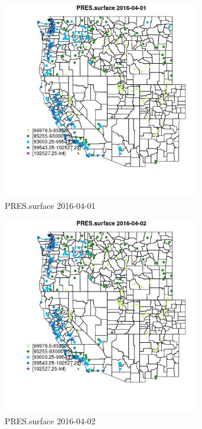 \begin{figure} 
\centering  
\includegraphics[width=0.77\textwidth]{Code_Outputs/Report_ML_input_PM25_Step4_part_e_de_duplicated_aveswNAs_MapObsPRESsurface2016-04-01.jpg} 
\caption{\label{fig:Report_ML_input_PM25_Step4_part_e_de_duplicated_aveswNAsMapObsPRESsurface2016-04-01}PRES.surface 2016-04-01} 
\end{figure} 
 

\begin{figure} 
\centering  
\includegraphics[width=0.77\textwidth]{Code_Outputs/Report_ML_input_PM25_Step4_part_e_de_duplicated_aveswNAs_MapObsPRESsurface2016-04-02.jpg} 
\caption{\label{fig:Report_ML_input_PM25_Step4_part_e_de_duplicated_aveswNAsMapObsPRESsurface2016-04-02}PRES.surface 2016-04-02} 
\end{figure} 
 

